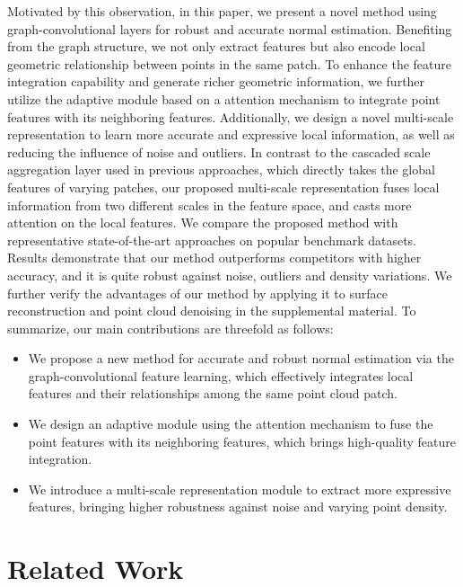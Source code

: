 \documentclass[runningheads]{llncs}
\begin{document}
Motivated by this observation, in this paper, we present a novel method using graph-convolutional layers for robust and accurate normal estimation. Benefiting from the graph structure, we not only extract features but also encode local geometric relationship between points in the same patch. To enhance the feature
integration capability and generate richer geometric information, we further utilize the adaptive module based on a attention mechanism to integrate point features with its neighboring features. Additionally, we design a novel multi-scale representation to learn more accurate and expressive local information, as well as reducing the influence of noise and outliers. In contrast to the cascaded scale aggregation layer used in previous approaches, which directly takes the global features of varying patches, our proposed multi-scale representation fuses local information from two different scales in the feature space, and casts more attention on the local features. We compare the proposed method with representative state-of-the-art approaches on popular benchmark datasets. Results demonstrate that our method outperforms competitors with higher accuracy, and it is quite robust against noise, outliers and density variations. We further verify the advantages of our method by applying it to surface reconstruction and point cloud denoising in the supplemental material. To summarize, our main contributions are threefold as follows: 
\begin{itemize}
    \item We propose a new method for accurate and robust normal estimation via the graph-convolutional feature learning, which effectively integrates local features and their relationships among the same point cloud patch.
\item We design an adaptive module using the attention mechanism to fuse the point features with its neighboring features, which brings high-quality feature integration.
    \item We introduce a multi-scale representation module to extract more expressive features, bringing higher robustness against noise and varying point density. 
\end{itemize}

\section{Related Work}\label{sec:related}
\end{document}
